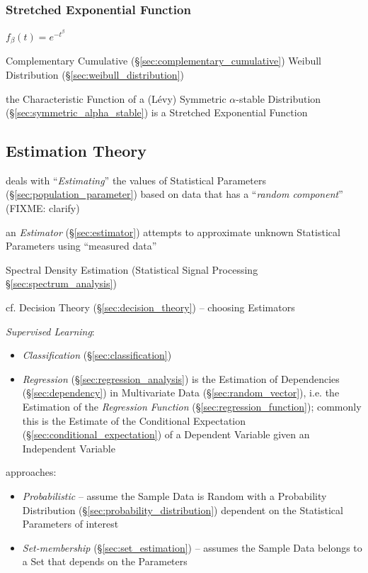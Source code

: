 \subsubsection{Stretched Exponential Function}\label{sec:stretched_exponential}

$f_\beta(t) = e^{-t^\beta}$

Complementary Cumulative (\S\ref{sec:complementary_cumulative}) Weibull
Distribution (\S\ref{sec:weibull_distribution})

the Characteristic Function of a (L\'evy) Symmetric $\alpha$-stable Distribution
(\S\ref{sec:symmetric_alpha_stable}) is a Stretched Exponential Function



\subsection{Estimation Theory}\label{sec:estimation_theory}

deals with ``\emph{Estimating}'' the values of Statistical Parameters
(\S\ref{sec:population_parameter}) based on data that has a ``\emph{random
  component}'' (FIXME: clarify)

an \emph{Estimator} (\S\ref{sec:estimator}) attempts to approximate unknown
Statistical Parameters using ``measured data''

\fist Spectral Density Estimation (Statistical Signal Processing
\S\ref{sec:spectrum_analysis})

\fist cf. Decision Theory (\S\ref{sec:decision_theory}) -- choosing Estimators

\fist \emph{Supervised Learning}:
\begin{itemize}
  \item \emph{Classification} (\S\ref{sec:classification})
  \item \emph{Regression} (\S\ref{sec:regression_analysis}) is the Estimation of
    Dependencies (\S\ref{sec:dependency}) in Multivariate Data
    (\S\ref{sec:random_vector}), i.e. the Estimation of the \emph{Regression
      Function} (\S\ref{sec:regression_function}); commonly this is the Estimate
    of the Conditional Expectation (\S\ref{sec:conditional_expectation}) of a
    Dependent Variable given an Independent Variable
\end{itemize}

approaches:
\begin{itemize}
  \item \emph{Probabilistic} -- assume the Sample Data is Random with a
    Probability Distribution (\S\ref{sec:probability_distribution}) dependent on
    the Statistical Parameters of interest
  \item \emph{Set-membership} (\S\ref{sec:set_estimation}) -- assumes the
    Sample Data belongs to a Set that depends on the Parameters
\end{itemize}

